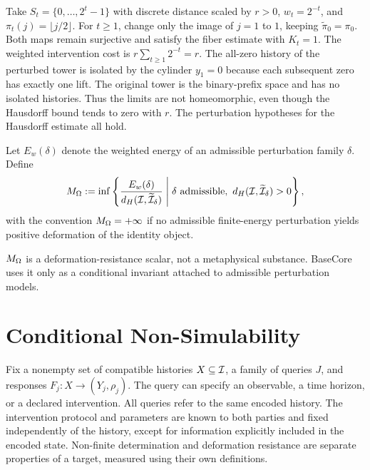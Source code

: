 \begin{example}\label{ex:hausdorff-not-isomorphism}
Take $S_t=\{0,\ldots,2^t-1\}$ with discrete distance scaled by $r>0$, $w_t=2^{-t}$, and $\pi_t(j)=\lfloor j/2\rfloor$. For $t\geq1$, change only the image of $j=1$ to $1$, keeping $\widetilde\pi_0=\pi_0$. Both maps remain surjective and satisfy the fiber estimate with $K_t=1$. The weighted intervention cost is $r\sum_{t\geq1}2^{-t}=r$. The all-zero history of the perturbed tower is isolated by the cylinder $y_1=0$ because each subsequent zero has exactly one lift. The original tower is the binary-prefix space and has no isolated histories. Thus the limits are not homeomorphic, even though the Hausdorff bound tends to zero with $r$. The perturbation hypotheses for the Hausdorff estimate all hold.
\end{example}


\begin{definition}\label{def:ontmass}
Let $E_w(\delta)$ denote the weighted energy of an admissible perturbation family $\delta$. Define
\[
M_\Omega:=\inf\left\{
\frac{E_w(\delta)}{d_H(\mathcal{I},\widetilde{\mathcal{I}}_\delta)}
\;\middle|\;
\delta \text{ admissible},\ d_H(\mathcal{I},\widetilde{\mathcal{I}}_\delta)>0
\right\},
\]
with the convention $M_\Omega=+\infty$ if no admissible finite-energy perturbation yields positive deformation of the identity object.
\end{definition}

\begin{remark}
$M_\Omega$ is a deformation-resistance scalar, not a metaphysical substance. BaseCore uses it only as a conditional invariant attached to admissible perturbation models.
\end{remark}

\section{Conditional Non-Simulability}

\begin{assumption}\label{ass:ns1}
Fix a nonempty set of compatible histories $X\subseteq\mathcal{I}$, a family of queries $J$, and responses $F_j:X\to (Y_j,\rho_j)$. The query can specify an observable, a time horizon, or a declared intervention. All queries refer to the same encoded history. The intervention protocol and parameters are known to both parties and fixed independently of the history, except for information explicitly included in the encoded state. Non-finite determination and deformation resistance are separate properties of a target, measured using their own definitions.
\end{assumption}

